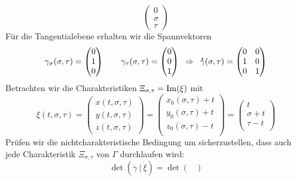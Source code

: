 \begin{exercisePage}[Charakteristikenmethode]
\begin{enumerate}[label=(zu \alph*), leftmargin=*]
\begin{equation*}
			\begin{pmatrix}
				0 \\
				\sigma \\
				\tau
			\end{pmatrix}
		\end{equation*}
		Für die Tangentialebene erhalten wir die Spannvektoren 
		\begin{equation*}
			\gamma_\sigma(\sigma, \tau) = 
			\begin{pmatrix}
				0 \\ 1 \\ 0
			\end{pmatrix}
			\qquad
			\gamma_\tau(\sigma, \tau) = 
			\begin{pmatrix}
				0 \\ 0 \\ 1
			\end{pmatrix}
			\enskip \Rightarrow \enskip
			\accentset{\mbox{\large\bfseries .}}{\gamma}(\sigma, \tau) = 
			\begin{pmatrix}
				0 & 0 \\ 1 & 0 \\ 0 & 1
			\end{pmatrix}
		\end{equation*}
		Betrachten wir die Charakteristiken $\Xi_{\sigma, \tau} = \operatorname{Im}(\xi)$ mit
		\begin{equation} \label{2eq: charakteristiken}
			\xi(t, \sigma, \tau) =
			\begin{pmatrix}
				x(t, \sigma, \tau) \\
				y(t, \sigma, \tau) \\
				z(t, \sigma, \tau)
			\end{pmatrix}
			= 
			\begin{pmatrix}
				x_0(\sigma, \tau) + t \\
				y_0(\sigma, \tau) + t \\
				z_0(\sigma, \tau) - t \\
			\end{pmatrix}
			=
			\begin{pmatrix}
				t \\
				\sigma + t \\
				\tau - t \\
			\end{pmatrix}
		\end{equation}
		Prüfen wir die nichtcharakteristische Bedingung um sicherzustellen, dass auch jede Charakteristik $\Xi_{\sigma, \tau}$ von $\Gamma$ durchlaufen wird:
		\begin{equation*}
			\det(\dot{\gamma} ~|~ \dot{\xi}) = \det\begin{pmatrix}

\end{pmatrix}
\end{equation*}
\end{enumerate}
\end{exercisePage}
